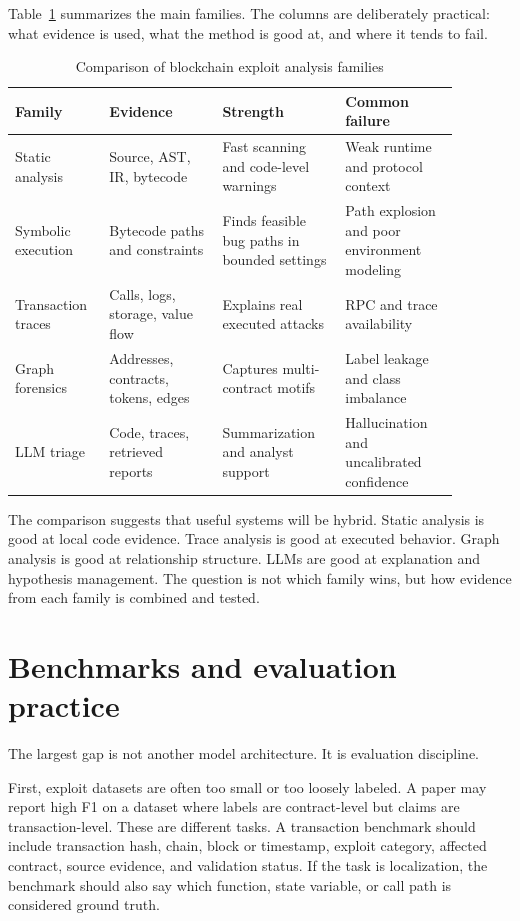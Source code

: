 \documentclass[conference]{IEEEtran}
\begin{document}
Table~\ref{tab:comparison} summarizes the main families. The columns are deliberately practical: what evidence is used, what the method is good at, and where it tends to fail.

\begin{table}[t]
\caption{Comparison of blockchain exploit analysis families}
\label{tab:comparison}
\centering
\small
\begin{tabular}{p{0.17\linewidth}p{0.23\linewidth}p{0.25\linewidth}p{0.23\linewidth}}
\toprule
Family & Evidence & Strength & Common failure \\
\midrule
Static analysis & Source, AST, IR, bytecode & Fast scanning and code-level warnings & Weak runtime and protocol context \\
Symbolic execution & Bytecode paths and constraints & Finds feasible bug paths in bounded settings & Path explosion and poor environment modeling \\
Transaction traces & Calls, logs, storage, value flow & Explains real executed attacks & RPC and trace availability \\
Graph forensics & Addresses, contracts, tokens, edges & Captures multi-contract motifs & Label leakage and class imbalance \\
LLM triage & Code, traces, retrieved reports & Summarization and analyst support & Hallucination and uncalibrated confidence \\
\bottomrule
\end{tabular}
\end{table}

The comparison suggests that useful systems will be hybrid. Static analysis is good at local code evidence. Trace analysis is good at executed behavior. Graph analysis is good at relationship structure. LLMs are good at explanation and hypothesis management. The question is not which family wins, but how evidence from each family is combined and tested.

\section{Benchmarks and evaluation practice}

The largest gap is not another model architecture. It is evaluation discipline.

First, exploit datasets are often too small or too loosely labeled. A paper may report high F1 on a dataset where labels are contract-level but claims are transaction-level. These are different tasks. A transaction benchmark should include transaction hash, chain, block or timestamp, exploit category, affected contract, source evidence, and validation status. If the task is localization, the benchmark should also say which function, state variable, or call path is considered ground truth.
\end{document}
